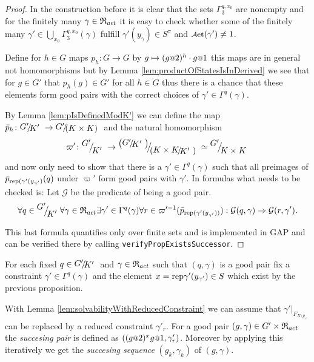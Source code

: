 \documentclass[a4paper,11pt]{amsart}
\begin{document}
\begin{proof}
 In the construction before it is clear that the sets $\Gamma_3^{q,x_0}$ are nonempty and for the finitely many $\gamma\in \mathfrak{R}_{act}$ it is
 easy to check whether some of the finitely many $\gamma'\in\bigcup_{x_0}\Gamma_3^{q,x_0}(\gamma)$ fulfill $\gamma'(y_\gamma) \in S^\pi$ and $\act(\gamma')\neq 1$.
 
 
  Define for $h\in G$ maps $p_h\colon G\to G$ by $g\mapsto (g\at{2})^{h}\cdot g\at{1}$ this maps are in general not homomorphisms but 
  by Lemma \ref{lem:productOfStatesIsInDerived} we see that for $g\in G'$ that $p_h(g)\in G'$ for all $h\in G$ thus there is a chance that these elements form good pairs with
  the correct choices of $\gamma' \in \Gamma^q(\gamma)$. 
 
  By Lemma \ref{lem:pIsDefinedModK'} we can define the map $\bar p_h\colon \RNK{G'}{K'} \to \RNK{G'}{(K\times K)}$
 and the natural homomorphism \[\varpi'\colon \RNK{G'}{K'} \to \RNK{\left(\RNK{G'}{K'}\right)}{\left(\RNK{K\times K}{K'}\right)} \simeq \RNK{G'}{K\times K} \]
 and now only need to show that there is a $\gamma'\in\Gamma^q(\gamma)$ such that all preimages of $\bar p_{\textup{rep}(\gamma'(y_{\gamma'})}(q)$ under $\varpi'$ 
 form good pairs with $\gamma'$. In formulas what needs to be checked is: Let $\mathcal{G}$ be the predicate of being a good pair. %
 \[\forall q\in\RNK{G'}{K'}
      \forall \gamma\in\Red_{act} 
	 \exists \gamma'\in \Gamma^q(\gamma)
	    \forall r\in \varpi'^{-1}(\bar p_{\textup{rep}(\gamma'(y_{\gamma'}))}):
	      \mathcal{G}(q,\gamma) \Rightarrow \mathcal{G}(r,\gamma').\]
 
 This last formula quantifies only over finite sets and is implemented in GAP and can be verified there by calling \lstinline{verifyPropExistsSuccessor}. 
 \end{proof}

 \begin{defi}
 For each fixed $q\in\RNK{G'}{K'}$ and $\gamma\in \mathfrak{R}_{act}$ such that $(q,\gamma)$ is a good pair
 fix a constraint $\gamma'\in\Gamma^q(\gamma)$ and the element $x=\textup{rep}\gamma'(y_{\gamma'})\in S$ which exist by the previous proposition.
 
 With Lemma \ref{lem:solvabilityWithReducedConstraint} we can assume that $\gamma'|_{F_{X\setminus y_{\gamma'}}}$ can be replaced by a reduced constraint $\gamma'_r$. 
 For a good pair $(g,\gamma)\in G'\times\mathfrak{R}_{act}$ the \emph{succesing pair} is defined as $\left((g\at{2})^xg\at{1},\gamma'_r\right)$.
 Moreover by applying this iteratively we get the \emph{succesing sequence} $(g_k,\gamma_k)$ of $(g,\gamma)$.
 \end{defi}
 
\end{document}
